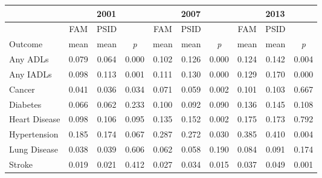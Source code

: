 \begin{tabular}{p{1.2in}*{3}{c}*{3}{c}*{3}{c}}
\hline
 \multicolumn{1}{c}{} & \multicolumn{3}{c}{2001} & \multicolumn{3}{c}{2007} & \multicolumn{3}{c}{2013} \\
\hline
 \multicolumn{1}{c}{} & FAM & PSID & & FAM & PSID & & FAM & PSID & \\
 \multicolumn{1}{l}{Outcome} & mean & mean & \textit{p} & mean & mean & \textit{p} & mean & mean & \textit{p} \\
\hline
Any ADLs&0.079&0.064&0.000&0.102&0.126&0.000&0.124&0.142&0.004\\
Any IADLs&0.098&0.113&0.001&0.111&0.130&0.000&0.129&0.170&0.000\\
Cancer&0.041&0.036&0.034&0.071&0.059&0.002&0.101&0.103&0.667\\
Diabetes&0.066&0.062&0.233&0.100&0.092&0.090&0.136&0.145&0.108\\
Heart Disease&0.098&0.106&0.095&0.135&0.152&0.002&0.175&0.173&0.792\\
Hypertension&0.185&0.174&0.067&0.287&0.272&0.030&0.385&0.410&0.004\\
Lung Disease&0.038&0.039&0.606&0.062&0.058&0.190&0.084&0.091&0.174\\
Stroke&0.019&0.021&0.412&0.027&0.034&0.015&0.037&0.049&0.001\\
\hline
\end{tabular}
